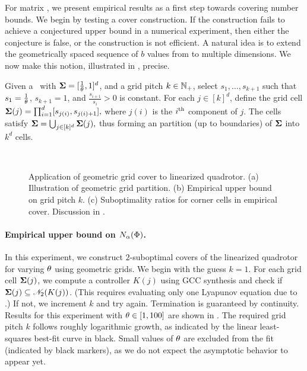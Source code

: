 \label{sec:grid}

For matrix \DDFproblems,
we present empirical results as a first step towards covering number bounds. %
We begin by testing a cover construction. %
If the construction fails to achieve a conjectured upper bound in a numerical experiment,
then either the conjecture is false,
or the construction is not efficient.
A natural idea is to extend
the geometrically spaced sequence of $b$ values from
to multiple dimensions.
We now make this notion, illustrated in , precise.

\begin{definition}
\label{def:geomgrid}
	Given a \DDFproblem\ with $\boldsymbol\Sigma = [\frac{1}{\theta}, 1]^d$,
	and a grid pitch $k \in \mathbb{N}_+$,
	select
	$s_1, \dots, s_{k+1}$
	such that
	$s_1 = \frac{1}{\theta}$,
	$s_{k + 1} = 1$,
	and $\frac{s_{i+1}}{s_i} > 0$
	is constant.
	For each $j \in [k]^d$, define the grid cell
	\(
		\boldsymbol\Sigma(j) = \textstyle \prod_{i=1}^d [s_{j(i)}, s_{j(i) + 1}],
	\)
	where $j(i)$ is the $i^{\mathrm{th}}$ component of $j$.
	The cells satisfy
	\(
		\boldsymbol\Sigma = \textstyle \bigcup_{j \in [k]^d} \boldsymbol\Sigma(j),
	\)
	thus forming an partition (up to boundaries) of $\boldsymbol\Sigma$ into $k^d$ cells.
\end{definition}

\begin{figure}%
	~\hfill
	~\hfill
	\caption{%
		Application of geometric grid cover to linearized quadrotor.
		(a) Illustration of geometric grid partition.
		(b) Empirical upper bound on grid pitch $k$. %
		(c) Suboptimality ratios for corner cells in empirical cover.
		Discussion in .
	}
\end{figure}

\paragraph{Empirical upper bound on $N_{\alpha}(\Phi)$.}
In this experiment, we construct $2$-suboptimal covers of
the linearized quadrotor for varying $\theta$
using geometric grids.
We begin with the guess $k = 1$.
For each grid cell $\boldsymbol\Sigma(j)$, we compute a controller $K(j)$ using GCC synthesis
and check if $\boldsymbol\Sigma(j) \subseteq \mathscr{N}_{2}(K(j))$.
(This requires evaluating only one Lyapunov equation due to .)
If not, we increment $k$ and try again.
Termination is guaranteed by continuity.
Results for this experiment
with $\theta \in [1, 100]$
are shown in
.
The required grid pitch $k$ follows roughly logarithmic growth,
as indicated by the linear least-squares best-fit curve in black.
Small values of $\theta$ are excluded from the fit (indicated by black markers),
as we do not expect the asymptotic behavior to appear yet.

